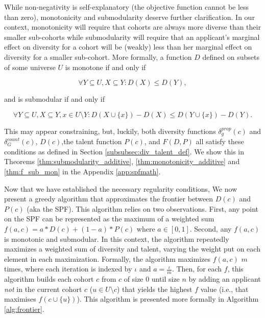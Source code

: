 While non-negativity is self-explanatory (the objective function cannot be less than zero), monotonicity and submodularity deserve further clarification. In our context, monotonicity will require that cohorts are always more diverse than their smaller sub-cohorts while submodularity will require that an applicant's marginal effect on diversity for a cohort will be (weakly) less than her marginal effect on diversity for a smaller sub-cohort. More formally, a function $D$ defined on subsets of some universe $U$ is monotone if and only if 

\begin{equation}
    \label{eq:mononicity}
    \forall Y \subseteq U, X \subseteq Y: D(X)\leq D(Y),
\end{equation}

\noindent and is submodular if and only if

\begin{equation}
    \label{eq:submodularity}
    \forall Y \subseteq U, X \subseteq Y, x \in U \setminus Y: D(X \cup \{x\}) - D(X) \leq D(Y \cup \{x\}) - D(Y).
\end{equation}

This may appear constraining, but, luckily, both diversity functions $\delta_g^{prop}(c)$ and $\delta_G^{count}(c)$, $D(c)$,the talent function $P(c)$, and $F(D,P)$ all satisfy these conditions as defined in Section \ref{subsubsec:div_talent_def}. We show this in Theorems \ref{thm:submodularity_additive}, \ref{thm:monotonicity_additive} and \ref{thm:f_sub_mon} in the Appendix \ref{app:spfmath}.

Now that we have established the necessary regularity conditions, We now present a greedy algorithm that approximates the frontier between $D(c)$ and $P(c)$ (aka the SPF). This algorithm relies on two observations. First, any point on the SPF can be represented as the maximum of a weighted sum $f(a,c) = a*D(c) + (1-a)*P(c)$ where $a \in [0,1]$. Second, any $f(a,c)$ is monotonic and submodular. In this context, the algorithm repeatedly maximizes a weighted sum of diversity and talent, varying  the weight put on each element in each maximization. Formally, the algorithm maximizes $f(a,c)$ $m$ times, where each iteration is indexed by $\iota$ and $a=\frac{\iota}{m}$. Then, for each $f$, this algorithm builds each cohort $c$ from $c$ of size $0$ until size $n$ by adding an applicant \textit{not} in the current cohort $c$ ($u \in U \setminus c$) that yields the highest $f$ value (i.e., that maximises $f(c \cup \{u\})$). This algorithm is presented more formally in Algorithm \ref{alg:frontier}. 

